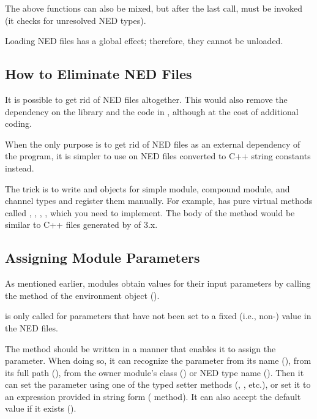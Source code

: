 The above functions can also be mixed, but after the last call,
 must be invoked (it checks for unresolved
NED types).

Loading NED files has a global effect; therefore, they cannot be unloaded.


\subsection{How to Eliminate NED Files}
\label{sec:embedding:eliminating-ned-files}

It is possible to get rid of NED files altogether. This would also
remove the dependency on the  library and the code in
, although at the cost of additional coding.

\begin{note}
When the only purpose is to get rid of NED files as an external dependency
of the program, it is simpler to use  on NED files
converted to C++ string constants instead.
\end{note}

The trick is to write  and  objects
for simple module, compound module, and channel types and register them
manually. For example,  has pure virtual methods called
, ,
, , which you
need to implement. The body of the  method would
be similar to C++ files generated by  of {\opp} 3.x.


\subsection{Assigning Module Parameters}
\label{sec:embedding:assigning-module-parameters}

As mentioned earlier, modules obtain values for their input parameters
by calling the  method of the environment object
().

\begin{note}
 is only called for parameters that have not
been set to a fixed (i.e., non-) value in the NED files.
\end{note}

The  method should be written in a manner that enables it to assign
the parameter. When doing so, it can recognize the parameter from its name
(), from its full path (),
from the owner module's class ()
or NED type name ().
Then it can set the parameter using one of the typed setter methods
(, , etc.), or set it
to an expression provided in string form ( method).
It can also accept the default value if it exists ().

